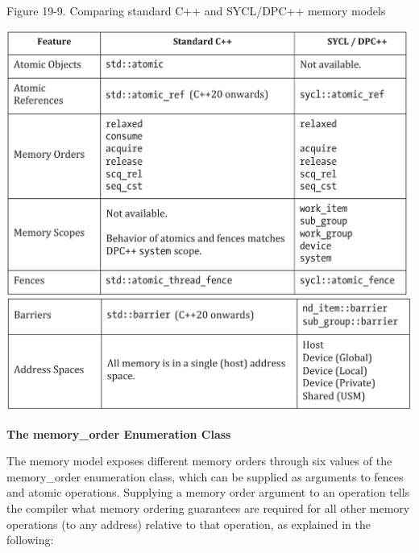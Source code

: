 \hspace*{\fill} \par %
Figure 19-9. Comparing standard C++ and SYCL/DPC++ memory models
\begin{center}
	\includegraphics[width=1.0\textwidth]{content/chapter-19/images/6}
	\includegraphics[width=1.0\textwidth]{content/chapter-19/images/7}
\end{center}

\hspace*{\fill} \par %
\textbf{The memory\_order Enumeration Class}

The memory model exposes different memory orders through six values of the memory\_order enumeration class, which can be supplied as arguments to fences and atomic operations. Supplying a memory order argument to an operation tells the compiler what memory ordering guarantees are required for all other memory operations (to any address) relative to that operation, as explained in the following:\par

